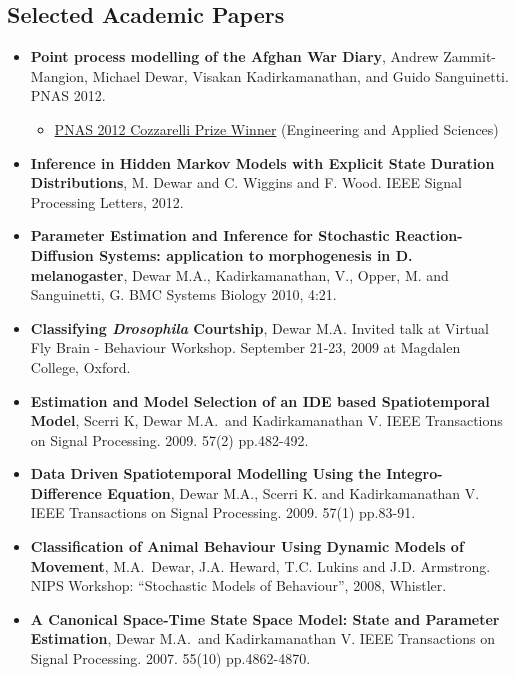 \documentclass[line, overlapped]{res}
\begin{document}
\begin{resume}
\section{Selected Academic Papers}

\begin{itemize}
\item
  \textbf{Point process modelling of the Afghan War Diary}, Andrew
  Zammit-Mangion, Michael Dewar, Visakan Kadirkamanathan, and Guido
  Sanguinetti. PNAS 2012.

  \begin{itemize}
  \item
	  \href{https://www.pnas.org/post/update/2012-cozzarelli-prize-recipients}{PNAS 2012 Cozzarelli Prize Winner} (Engineering and Applied Sciences)
  \end{itemize}
\item
  \textbf{Inference in Hidden Markov Models with Explicit State Duration
  Distributions}, M. Dewar and C. Wiggins and F. Wood. IEEE Signal
  Processing Letters, 2012.
\item
  \textbf{Parameter Estimation and Inference for Stochastic
  Reaction-Diffusion Systems: application to morphogenesis in D.
  melanogaster}, Dewar M.A., Kadirkamanathan, V., Opper, M. and
  Sanguinetti, G. BMC Systems Biology 2010, 4:21.
\item
  \textbf{Classifying \emph{Drosophila} Courtship}, Dewar M.A. Invited
  talk at Virtual Fly Brain - Behaviour Workshop. September 21-23, 2009
  at Magdalen College, Oxford.
\item
  \textbf{Estimation and Model Selection of an IDE based Spatiotemporal
  Model}, Scerri K, Dewar M.A.~and Kadirkamanathan V. IEEE Transactions
  on Signal Processing. 2009. 57(2) pp.482-492.
\item
  \textbf{Data Driven Spatiotemporal Modelling Using the
  Integro-Difference Equation}, Dewar M.A., Scerri K. and
  Kadirkamanathan V. IEEE Transactions on Signal Processing. 2009. 57(1)
  pp.83-91.
\item
  \textbf{Classification of Animal Behaviour Using Dynamic Models of
  Movement}, M.A.~Dewar, J.A. Heward, T.C. Lukins and J.D. Armstrong.
  NIPS Workshop: ``Stochastic Models of Behaviour'', 2008, Whistler.
\item
  \textbf{A Canonical Space-Time State Space Model: State and Parameter
  Estimation}, Dewar M.A.~and Kadirkamanathan V. IEEE Transactions on
  Signal Processing. 2007. 55(10) pp.4862-4870.
\end{itemize}

\end{resume}
\end{document}
